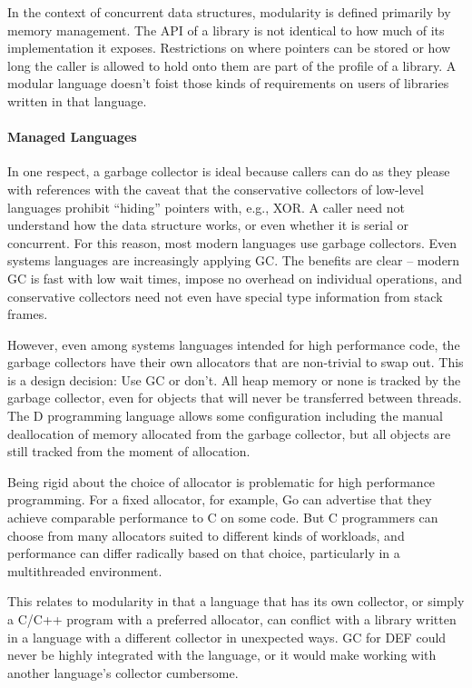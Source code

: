In the context of concurrent data structures, modularity is defined primarily by memory management.  The API of a library is not identical to how much of its implementation it exposes.  Restrictions on where pointers can be stored or how long the caller is allowed to hold onto them are part of the profile of a library.  A modular language doesn't foist those kinds of requirements on users of libraries written in that language.

\paragraph{Managed Languages} In one respect, a garbage collector is ideal because callers can do as they please with references with the caveat that the conservative collectors of low-level languages prohibit ``hiding'' pointers with, e.g., XOR.  A caller need not understand how the data structure works, or even whether it is serial or concurrent.  For this reason, most modern languages use garbage collectors.  Even systems languages are increasingly applying GC.  The benefits are clear -- modern GC is fast with low wait times,\cite{ShahriyarBM14} impose no overhead on individual operations, and conservative collectors need not even have special type information from stack frames.

However, even among systems languages intended for high performance code, the garbage collectors have their own allocators that are non-trivial to swap out.\cite{Go}\cite{DotNetGC}\cite{D}  This is a design decision: Use GC or don't.  All heap memory or none is tracked by the garbage collector, even for objects that will never be transferred between threads.  The D programming language allows some configuration including the manual deallocation of memory allocated from the garbage collector, but all objects are still tracked from the moment of allocation.\cite{DPhobos}

Being rigid about the choice of allocator is problematic for high performance programming.  For a fixed allocator, for example, Go can advertise that they achieve comparable performance to C on some code.  But C programmers can choose from many allocators suited to different kinds of workloads,\cite{Hoard}\cite{TCMalloc}\cite{JEMalloc}\cite{Supermalloc} and performance can differ radically based on that choice, particularly in a multithreaded environment.

This relates to modularity in that a language that has its own collector, or simply a C/C++ program with a preferred allocator, can conflict with a library written in a language with a different collector in unexpected ways.  GC for DEF could never be highly integrated with the language, or it would make working with another language's collector cumbersome.

